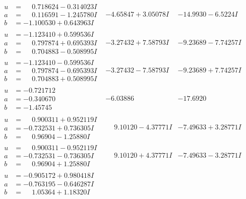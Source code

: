 \documentclass[1p]{elsarticle_modified}
\theoremstyle{definition}
\begin{document}
$$\begin{array}{c|c|c}
\begin{aligned}
u &= \phantom{-}0.718624 - 0.314023 I \\
a &= \phantom{-}0.116591 - 1.245780 I \\
b &= -1.100530 + 0.643963 I\end{aligned}
 & -4.65847 + 3.05078 I & -14.9930 - 6.5224 I \\ \hline\begin{aligned}
u &= -1.123410 + 0.599536 I \\
a &= \phantom{-}0.797874 + 0.695393 I \\
b &= \phantom{-}0.704883 - 0.508995 I\end{aligned}
 & -3.27432 + 7.58793 I & -9.23689 - 7.74257 I \\ \hline\begin{aligned}
u &= -1.123410 - 0.599536 I \\
a &= \phantom{-}0.797874 - 0.695393 I \\
b &= \phantom{-}0.704883 + 0.508995 I\end{aligned}
 & -3.27432 - 7.58793 I & -9.23689 + 7.74257 I \\ \hline\begin{aligned}
u &= -0.721712\phantom{ +0.000000I} \\
a &= -0.340670\phantom{ +0.000000I} \\
b &= -1.45745\phantom{ +0.000000I}\end{aligned}
 & -6.03886\phantom{ +0.000000I} & -17.6920\phantom{ +0.000000I} \\ \hline\begin{aligned}
u &= \phantom{-}0.900311 + 0.952119 I \\
a &= -0.732531 + 0.736305 I \\
b &= \phantom{-}0.96904 - 1.25880 I\end{aligned}
 & \phantom{-}9.10120 - 4.37771 I & -7.49633 + 3.28771 I \\ \hline\begin{aligned}
u &= \phantom{-}0.900311 - 0.952119 I \\
a &= -0.732531 - 0.736305 I \\
b &= \phantom{-}0.96904 + 1.25880 I\end{aligned}
 & \phantom{-}9.10120 + 4.37771 I & -7.49633 - 3.28771 I \\ \hline\begin{aligned}
u &= -0.905172 + 0.980418 I \\
a &= -0.763195 - 0.646287 I \\
b &= \phantom{-}1.05364 + 1.18320 I\end{aligned}

\end{array}$$
\end{document}
